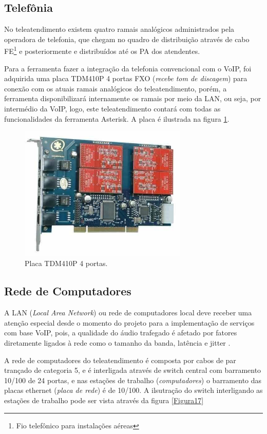 \subsection{Telefônia}
No teleatendimento existem quatro ramais analógicos administrados pela operadora de telefonia, que chegam no quadro de distribuição através de cabo FE\footnote{Fio telefônico para instalações aéreas} e posteriormente e distribuídos até os PA dos atendentes.

Para a ferramenta fazer a integração da telefonia convencional com o VoIP, foi adquirida uma placa TDM410P 4 portas FXO (\textit{recebe tom de discagem}) para conexão com os atuais ramais analógicos do teleatendimento, porém, a ferramenta disponibilizará internamente os ramais por meio da LAN, ou seja, por intermédio da VoIP, logo, este teleatendimento contará com todas as funcionalidades da ferramenta Asterisk. A placa é ilustrada na figura \ref{Figura16}.

\begin{figure}[h]
	\centering
	\includegraphics[width=8cm]{imagens/tdm410p.jpg}
	\caption{Placa TDM410P 4 portas.}
    \label{Figura16}
\end{figure}

\subsection{Rede de Computadores}
A LAN (\textit{Local Area Network}) ou rede de computadores local deve receber uma atenção especial desde o momento do projeto para a implementação de serviços com base VoIP, pois, a qualidade do áudio trafegado é afetado por fatores diretamente ligados à rede como o tamanho da banda, latência e jitter \cite{andersonramires2005}.

A rede de computadores do teleatendimento é composta por cabos de par trançado de categoria 5, e é interligada através de switch central com barramento 10/100 de 24 portas, e nas estações de trabalho (\textit{computadores}) o barramento das placas ethernet (\textit{placa de rede}) é de 10/100. A ilsutração do switch interligando as estações de trabalho pode ser vista através da figura \ref{Figura17}


